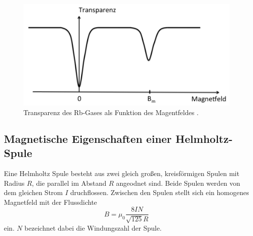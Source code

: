 \begin{figure}[H]
    \centering
    \includegraphics[scale= 0.5]{pictures/TB.png}
    \caption{Transparenz des Rb-Gases als Funktion des Magentfeldes \cite{V21}.}
    \label{fig:TB}
\end{figure}

\subsection{Magnetische Eigenschaften einer Helmholtz-Spule}
Eine Helmholtz Spule besteht aus zwei gleich großen, kreisförmigen 
Spulen mit Radius $R$, die parallel im Abstand $R$ angeodnet sind. 
Beide Spulen werden von dem gleichen Strom $I$ druchflossen. Zwischen 
den Spulen stellt sich ein homogenes Magnetfeld mit der Flussdichte
\begin{equation}
    B=\mu_0\frac{8IN}{\sqrt{125}R}
    \label{eqn:helmholtz}
\end{equation}
ein. $N$ bezeichnet dabei die Windungszahl der Spule.
